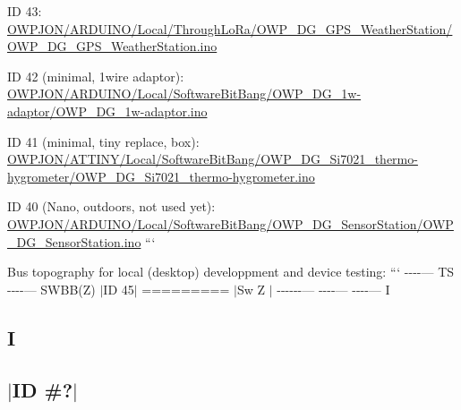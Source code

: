 \begin{DoxyItemize}
\item I\-D 43\-: \hyperlink{OWP__DG__GPS__WeatherStation_8ino}{O\-W\-P\-J\-O\-N/\-A\-R\-D\-U\-I\-N\-O/\-Local/\-Through\-Lo\-Ra/\-O\-W\-P\-\_\-\-D\-G\-\_\-\-G\-P\-S\-\_\-\-Weather\-Station/\-O\-W\-P\-\_\-\-D\-G\-\_\-\-G\-P\-S\-\_\-\-Weather\-Station.\-ino}
\item I\-D 42 (minimal, 1wire adaptor)\-: \hyperlink{OWP__DG__1w-adaptor_8ino}{O\-W\-P\-J\-O\-N/\-A\-R\-D\-U\-I\-N\-O/\-Local/\-Software\-Bit\-Bang/\-O\-W\-P\-\_\-\-D\-G\-\_\-1w-\/adaptor/\-O\-W\-P\-\_\-\-D\-G\-\_\-1w-\/adaptor.\-ino}
\item I\-D 41 (minimal, tiny replace, box)\-: \hyperlink{OWP__DG__Si7021__thermo-hygrometer_8ino}{O\-W\-P\-J\-O\-N/\-A\-T\-T\-I\-N\-Y/\-Local/\-Software\-Bit\-Bang/\-O\-W\-P\-\_\-\-D\-G\-\_\-\-Si7021\-\_\-thermo-\/hygrometer/\-O\-W\-P\-\_\-\-D\-G\-\_\-\-Si7021\-\_\-thermo-\/hygrometer.\-ino}
\item I\-D 40 (Nano, outdoors, not used yet)\-: \hyperlink{OWP__DG__SensorStation_8ino}{O\-W\-P\-J\-O\-N/\-A\-R\-D\-U\-I\-N\-O/\-Local/\-Software\-Bit\-Bang/\-O\-W\-P\-\_\-\-D\-G\-\_\-\-Sensor\-Station/\-O\-W\-P\-\_\-\-D\-G\-\_\-\-Sensor\-Station.\-ino} ```
\end{DoxyItemize}

Bus topography for local (desktop) developpment and device testing\-: ``` -\/-\/-\/-\/--- T\-S -\/-\/-\/-\/--- S\-W\-B\-B(\-Z) $\vert$\-I\-D 45$\vert$ ========= $\vert$\-Sw Z $\vert$ -\/-\/-\/-\/-\/-\/--- -\/-\/-\/-\/--- -\/-\/-\/-\/--- I \subsection*{I }

\subsection*{$\vert$\-I\-D \#?$\vert$ }


